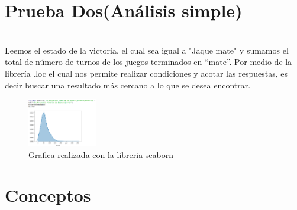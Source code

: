 \documentclass[journal]{IEEEtran}
\begin{document}
\section{Prueba Dos(Análisis simple)}\\
Leemos el estado de la victoria, el cual sea igual a "Jaque mate" y sumamos el total de número de turnos de los juegos terminados en “mate”. Por medio de la librería .loc el cual nos permite realizar condiciones y acotar las respuestas, es decir buscar una resultado más cercano a lo que se desea encontrar.
\begin{figure}[h!]
\centering
\includegraphics[width=0.27\textwidth]{ImagenesA/PruebaDos.png}
\caption{Grafica realizada con la libreria seaborn}
\end{figure}


\section{Conceptos}
\end{document}
